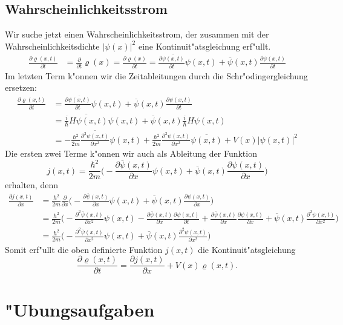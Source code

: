 \subsection{Wahrscheinlichkeitsstrom}
Wir suche jetzt einen Wahrscheinlichkeitsstrom, der zusammen mit
der Wahrscheinlichkeitsdichte $|\psi(x)|^2$ eine Kontinuit"atsgleichung
erf"ullt.
\begin{align*}
\frac{\partial\varrho(x,t)}{\partial t}
&=
\frac{\partial}{\partial t} \varrho(x)
=
\frac{\partial\varrho(x)}{\partial t}
=
\frac{\partial\overline{\psi(x,t)}}{\partial t}\psi(x,t)
+
\overline{\psi}(x,t)\frac{\partial\psi(x,t)}{\partial t}
\end{align*}
Im letzten Term k"onnen wir die Zeitableitungen durch die
Schr"odingergleichung ersetzen:
\begin{align*}
\frac{\partial\varrho(x,t)}{\partial t}
&=
\frac{\partial\overline{\psi(x,t)}}{\partial t}\psi(x,t)
+
\overline{\psi}(x,t)\frac{\partial\psi(x,t)}{\partial t}
\\
&=
\overline{ \frac{i}{\hbar}H \psi(x,t) }\psi(x,t)
+
\overline{\psi}(x,t)\frac{i}{\hbar} H \psi(x,t)
\\
&=
-
\frac{\hbar^2}{2m}\overline{\frac{\partial^2\psi(x,t)}{\partial x^2}}\psi(x,t)
+
\frac{\hbar^2}{2m}\frac{\partial^2\psi(x,t)}{\partial x^2}\overline{\psi(x,t)}
+
V(x)|\psi(x,t)|^2
\end{align*}
Die ersten zwei Terme k"onnen wir auch als Ableitung
der Funktion
\[
j(x,t)=
\frac{\hbar^2}{2m}
\biggl(
-\frac{\partial\overline{\psi}(x,t)}{\partial x}\psi(x,t)
+\overline{\psi}(x,t)\frac{\partial\psi(x,t)}{\partial x}
\biggr)
\]
erhalten, denn
\begin{align*}
\frac{\partial j(x,t)}{\partial x}
&=
\frac{\hbar^2}{2m}
\frac{\partial}{\partial x}
\biggl(
-\frac{\partial\overline{\psi}(x,t)}{\partial x}\psi(x,t)
+\overline{\psi}(x,t)\frac{\partial\psi(x,t)}{\partial x}
\biggr)
\\
&=
\frac{\hbar^2}{2m}
\biggl(
-
\frac{\partial^2\overline{\psi}(x,t)}{\partial x^2}
\psi(x,t)
-
\frac{\partial\overline{\psi}(x,t)}{\partial x}
\frac{\partial\psi(x,t)}{\partial t}
+
\frac{\partial\overline{\psi}(x,t)}{\partial x}
\frac{\partial\psi(x,t)}{\partial x}
+
\overline{\psi}(x,t)
\frac{\partial^2\psi(x,t)}{\partial x^2}
\biggr)
\\
&=
\frac{\hbar^2}{2m}
\biggl(
-
\frac{\partial^2\overline{\psi}(x,t)}{\partial x^2}
\psi(x,t)
+
\overline{\psi}(x,t)
\frac{\partial^2\psi(x,t)}{\partial x^2}
\biggr)
\end{align*}
Somit erf"ullt die oben definierte Funktion $j(x,t)$ die
Kontinuit"atsgleichung
\[
\frac{\partial\varrho(x,t)}{\partial t}
=
\frac{\partial j(x,t)}{\partial x} +V(x)\varrho(x,t).
\]

\section*{"Ubungsaufgaben}
\begin{uebungsaufgaben}
\item

\item

\end{uebungsaufgaben}


